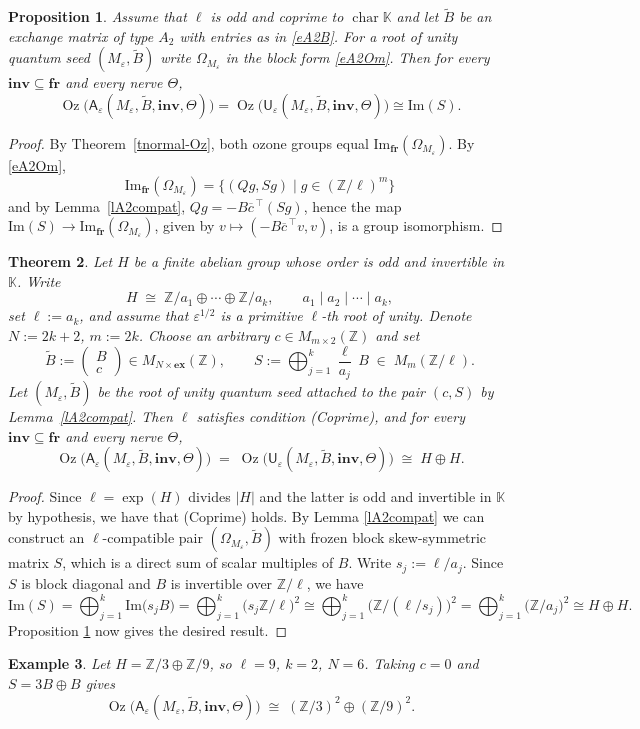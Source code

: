 \documentclass[11pt]{amsart}
\theoremstyle{plain}
\newtheorem{theorem}{Theorem}[section]
\newtheorem{proposition}[theorem]{Proposition}
\newtheorem{example}[theorem]{Example}
\newcommand \bth[1] { \begin{theorem}\label{t#1} }
\newcommand \bpr[1] { \begin{proposition}\label{p#1} }
\newcommand \bex[1] { \begin{example}\label{e#1}\rm }
\renewcommand {\eth} { \end{theorem} }
\newcommand {\epr} { \end{proposition} }
\newcommand {\eex} { \end{example} }
\newcommand \leref[1]{Lemma \ref{l#1}}
\newcommand \prref[1]{Proposition \ref{p#1}}
\def \KK {{\mathbb C}}
\def \KK {{\mathbb K}}
\def \Zset {{\mathbb Z}}
\def \A {{\boldsymbol{\mathsf A}}}
\def \U {{\boldsymbol{\mathsf U}}}
\newcommand \ex {{\mathbf{ex}}}
\newcommand \fr {{\mathbf{fr}}}
\newcommand \inv {{\mathbf{inv}}}
\def \ep {\varepsilon}
\DeclareMathOperator \Oz { {\mathrm{Oz}}}
\DeclareMathOperator \charr { {\mathrm{char}} }
\renewcommand \Im { {\mathrm{Im}} }
\begin{document}
\bpr{A2}
Assume that $\ell$ is odd and coprime to $\charr \KK$ and let $\widetilde{B}$ be an exchange matrix of type
$A_2$ with entries as in \eqref{eA2B}. For a root of unity quantum seed 
$(M_\ep, \widetilde{B})$ write $\Omega_{M_\ep}$ in the block
form \eqref{eA2Om}. Then for every $\inv \subseteq \fr$ and every nerve $\Theta$,
$$
\Oz\bigl( \A_\ep(M_\ep, \widetilde{B}, \inv, \Theta) \bigr)
=\Oz\bigl( \U_\ep(M_\ep, \widetilde{B}, \inv, \Theta) \bigr)\cong  \Im(S).$$
\epr
\begin{proof}
    By Theorem~\ref{tnormal-Oz}, both ozone groups equal
$\Im_{\fr}(\Omega_{M_\ep})$. By \eqref{eA2Om},
$$\Im_{\fr}(\Omega_{M_\ep})
= \bigl\{ (Qg, Sg) \mid g \in (\Zset/\ell)^m \bigr\} $$
and by Lemma~\ref{lA2compat}, $Qg = - B \overline{c}^{\,\top} (S g)$, hence the map
$\Im(S) \to \Im_{\fr}(\Omega_{M_\ep})$, given by
$v \mapsto (- B \overline{c}^{\,\top} v, v)$, is a group isomorphism.
\end{proof}
\bth{A2realize}
Let $H$ be a finite abelian group whose order is odd and invertible in $\KK$. Write
\[
H \; \cong \; \Zset/a_1 \oplus \cdots \oplus \Zset/a_k,
\qquad a_1 \mid a_2 \mid \cdots \mid a_k,
\]
set $\ell := a_k$, and assume that $\ep^{1/2}$ is a primitive $\ell$-th root of unity. Denote $N := 2k+2$, $m := 2k$. Choose an arbitrary $c \in M_{m \times 2}(\Zset)$ 
and set
\begin{equation}
\label{eSrealize}
\widetilde{B} := \begin{pmatrix} B \\ c \end{pmatrix}
\in M_{N \times \mathrm{\ex}}(\Zset),
\qquad
S := \bigoplus_{j=1}^{k} \frac{\ell}{a_j}\, B \; \in \; M_{m}(\Zset/\ell).
\end{equation}
Let $(M_\ep, \widetilde{B})$ be the root of unity quantum seed attached to the
pair $(c,S)$ by Lemma~\ref{lA2compat}. Then $\ell$ satisfies condition
\textup{(Coprime)}, and for every $\inv \subseteq \fr$ and every nerve $\Theta$,
\[
\Oz \bigl( \A_\ep(M_\ep, \widetilde{B}, \inv, \Theta) \bigr)
\; = \;
\Oz \bigl( \U_\ep(M_\ep, \widetilde{B}, \inv, \Theta) \bigr)
\; \cong \; H \oplus H.
\]
\eth

\begin{proof}
Since $\ell = \exp(H)$ divides $|H|$ and the latter is odd and invertible
in $\KK$ by hypothesis, we have that (Coprime) holds. By \leref{A2compat} we can construct an $\ell$-compatible pair $(\Omega_{M_\ep}, \widetilde{B})$ with frozen block skew-symmetric matrix $S$, which is a direct sum of scalar multiples of $B$.  
Write $s_j := \ell/a_j$. Since $S$ is block diagonal
and $B$ is invertible over $\Zset/\ell$, we have
\[
\Im(S)  =  \bigoplus_{j=1}^{k} \Im \bigl( s_j B \bigr)
 = \bigoplus_{j=1}^{k} \bigl( s_j \Zset/\ell \bigr)^{2}
 \cong  \bigoplus_{j=1}^{k} \bigl( \Zset/(\ell/s_j) \bigr)^{2}
 = \bigoplus_{j=1}^{k} \bigl( \Zset/a_j \bigr)^{2}
\cong H \oplus H .
\]
\prref{A2} now gives the desired result.
\end{proof}
\bex{ozone39}
Let $H = \Zset/3 \oplus \Zset/9$, so $\ell = 9$, $k = 2$, $N = 6$. Taking $c=0$
and $S = 3B \oplus B$ gives
\[
\Oz \bigl( \A_\ep(M_\ep, \widetilde{B}, \inv, \Theta) \bigr)
\; \cong \; (\Zset/3)^2 \oplus (\Zset/9)^2 .
\]
\eex
\end{document}
